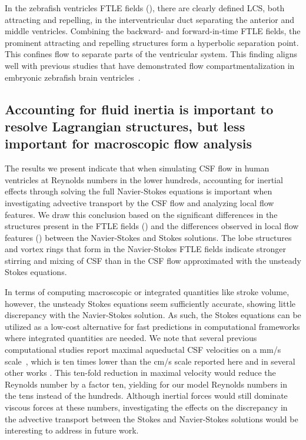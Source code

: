 \documentclass{template}
\begin{document}
In the zebrafish ventricles FTLE fields (),
there are clearly defined LCS, both attracting and repelling,
in the interventricular duct separating the anterior and middle ventricles.
Combining the backward- and forward-in-time FTLE fields,
the prominent attracting and repelling structures form a hyperbolic separation point. 
This confines flow to separate parts of the ventricular system.
This finding aligns well with previous studies that have demonstrated flow
compartmentalization in embryonic zebrafish
brain ventricles~\cite{Olstad2019CiliaryDevelopment,
Herlyng2025AdvectionDiffusion}.

\subsection{Accounting for fluid inertia is important to resolve Lagrangian structures,
but less important for macroscopic flow analysis}
The results we present indicate that when simulating CSF flow
in human ventricles at Reynolds numbers in the lower hundreds,
accounting for inertial effects through
solving the full Navier-Stokes equations is important when investigating
advective transport by the CSF flow and analyzing local flow features.
We draw this conclusion based on the significant differences in the structures
present in the FTLE fields () and the
differences observed in local flow features ()
between the Navier-Stokes and Stokes solutions. The lobe structures and
vortex rings that form in the Navier-Stokes FTLE fields
indicate stronger stirring and mixing of
CSF than in the CSF flow approximated with the unsteady Stokes equations.

In terms of computing macroscopic or integrated quantities like stroke volume,
however, the unsteady Stokes equations seem sufficiently accurate, showing little discrepancy with
the Navier-Stokes solution. As such, the Stokes equations can be
utilized as a low-cost alternative for fast predictions
in computational frameworks where integrated quantities are needed.
We note that several previous computational studies report maximal aqueductal
CSF velocities on a mm/s scale~\cite{enzmann1993cerebrospinal, enzmann1991normal,
Causemann2022HumanFramework, Sweetman2011ThreeDimensional, howden2008three, wagshul2011pulsating,
greitz1993pulsatile, sweetman2011cerebrospinal}, which is ten times lower than the
cm/s scale reported here and in several other works
\cite{kim1999quantitative, nitz1992flow, Kurtcuoglu2007ComputationalSylvius}. 
This ten-fold reduction in maximal velocity would reduce the Reynolds number
by a factor ten, yielding for our model Reynolds numbers in the tens instead of the hundreds.
Although inertial forces would still dominate viscous forces at 
these numbers, investigating the effects on the discrepancy in the advective transport
between the Stokes and Navier-Stokes solutions would be interesting to address in future work.
\end{document}
